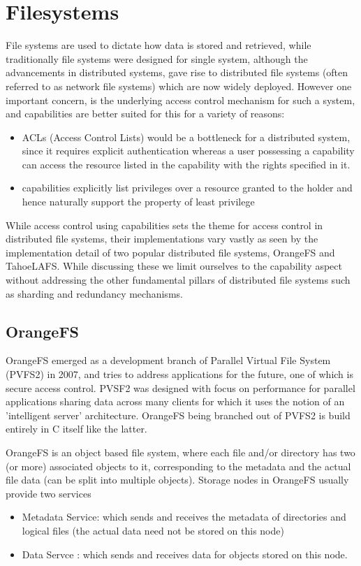 \section{Filesystems}
\label{sec:filesystem}

File systems are used to dictate how data is stored and retrieved, while traditionally file systems were designed for single system, although the advancements in distributed systems, gave rise to distributed file systems (often referred to as network file systems) which are now widely deployed. However one important concern, is the underlying access control mechanism for such a system, and capabilities are better suited\cite{miltchev2008} for this for a variety of reasons:
\begin{itemize}
\item ACLs (Access Control Lists) would be a bottleneck for a distributed system, since it requires explicit authentication whereas a user possessing a capability can access the resource listed in the capability with the rights specified in it.
\item capabilities explicitly list privileges over a resource granted to the holder and hence naturally support the property of least privilege
\end{itemize} 
While access control using capabilities sets the theme for access control in distributed file systems, their implementations vary vastly as seen by the implementation detail of two popular distributed file systems, OrangeFS and TahoeLAFS. While discussing these we limit ourselves to the capability aspect without addressing the other fundamental pillars of distributed file systems such as sharding and redundancy mechanisms.

\subsection{ OrangeFS }
OrangeFS emerged as a development branch of Parallel Virtual File System (PVFS2) in 2007, and tries to address applications for the future, one of which is secure access control. PVSF2 was designed with focus on performance for parallel applications sharing data across many clients for which it uses the notion of an 'intelligent server' architecture. OrangeFS being branched out of PVFS2 is build entirely in C itself like the latter.

OrangeFS is an object based file system, where each file and/or directory has two (or more) associated objects to it, corresponding to the metadata and the actual file data (can be split into multiple objects). Storage nodes in OrangeFS usually provide two services
\begin{itemize}
\item Metadata Service: which sends and receives the metadata of directories and logical files (the actual data need not be stored on this node)
\item Data Servce : which sends and receives data for objects stored on this node.
\end{itemize}

